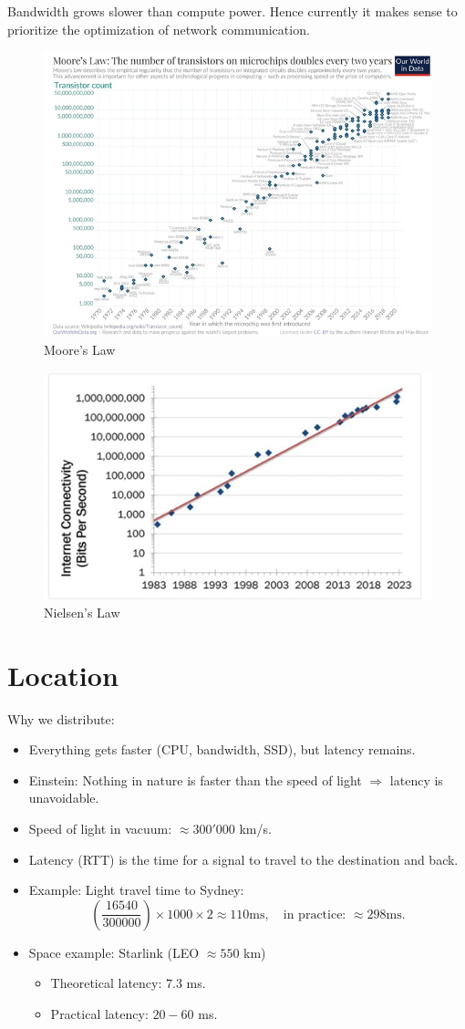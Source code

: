 \documentclass[../Main.tex]{subfiles}
\begin{document}
Bandwidth grows slower than compute power. Hence currently it makes sense
to prioritize the optimization of network communication.


\begin{figure}[H]
    \centering
    \includegraphics[width=0.5\linewidth]{Images/moore-law.png}
    \caption{Moore's Law}
\end{figure}

\begin{figure}[H]
    \centering
    \includegraphics[width=0.5\linewidth]{Images/nielsen-law.png}
    \caption{Nielsen's Law}
\end{figure}

\section{Location}

Why we distribute:
\begin{itemize}
    \item Everything gets faster (CPU, bandwidth, SSD), but latency remains.
    \item Einstein: Nothing in nature is faster than the speed of light $\Rightarrow$ latency is unavoidable.
    \item Speed of light in vacuum: $\approx 300'000$ km/s.
    \item Latency (RTT) is the time for a signal to travel to the destination and back.
    \item Example: Light travel time to Sydney:
    \[
    \left(\frac{16540}{300000}\right) \times 1000 \times 2 \approx 110 \text{ms}, \quad \text{in practice: } \approx 298 \text{ms}.
    \]
    \item Space example: Starlink (LEO $\approx 550$ km)
    \begin{itemize}
        \item Theoretical latency: $7.3$ ms.
        \item Practical latency: $20-60$ ms.
    \end{itemize}
\end{itemize}
\end{document}
